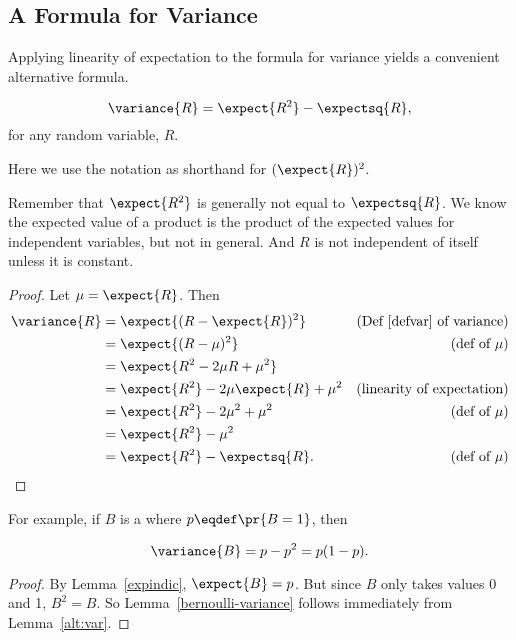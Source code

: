 \iffalse
For example, for independent random variables, the variance of a sum
is the sum of the variances; that is, $\variance{R_1 + R_2} =
\variance{R_1} + \variance{R_2}$.  We will prove this fact below.
\fi

\subsection{A Formula for Variance}

Applying linearity of expectation to the formula for variance yields a convenient
alternative formula.
\begin{lemma}\label{alt:var}
\[
\variance{R} = \expect{R^2} - \expectsq{R},
\]
for any random variable, $R$.
\end{lemma}
Here we use the notation  as shorthand for
$(\expect{R})^2$.

\begin{editingnotes}
Remember that $\expect{R^2}$ is generally not equal to $\expectsq{R}$.  We
know the expected value of a product is the product of the expected values
for independent variables, but not in general.  And $R$ is not independent
of itself unless it is constant.

\end{editingnotes}

\begin{proof}
Let $\mu = \expect{R}$.  Then
\begin{align*}
\variance{R} & =   \expect{(R - \expect{R})^2}
               & \text{(Def~\ref{defvar} of variance)}\\
        & = \expect{(R - \mu)^2} & \text{(def of $\mu$)}\\
        & = \expect{R^2 - 2  \mu R + \mu^2} \\
        & = \expect{R^2} - 2 \mu \expect{R} + \mu^2
                & \text{(linearity of expectation)}\\
        & = \expect{R^2} - 2 \mu^2 + \mu^2
              &  \text{(def of $\mu$)}\\
        & = \expect{R^2} - \mu^2\\
        & = \expect{R^2} - \expectsq{R}.
                  &  \text{(def of $\mu$)}
\end{align*}
\end{proof}

For example, if $B$ is a  where $p\eqdef
\pr{B=1}$, then
\begin{lemma}\label{bernoulli-variance}
\begin{equation}%
\variance{B} = p-p^2 = p(1-p).
\end{equation}
\begin{proof}
  By Lemma~\ref{expindic}, $\expect{B}= p$.  But since $B$ only takes
  values 0 and 1, $B^2 = B$.  So Lemma~\ref{bernoulli-variance} follows
  immediately from Lemma~\ref{alt:var}.
\end{proof}

\end{lemma}

